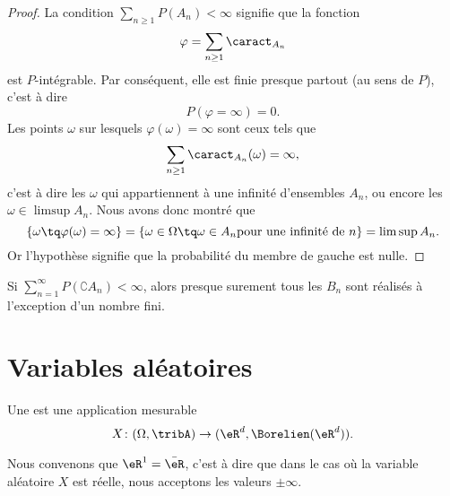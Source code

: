 \begin{proof}
    La condition \( \sum_{n\geq 1}P(A_n)<\infty\) signifie que la fonction
    \begin{equation}
        \varphi=\sum_{n\geq 1}\caract_{A_n}
    \end{equation}
    est \( P\)-intégrable. Par conséquent, elle est finie presque partout (au sens de \( P\)), c'est à dire
    \begin{equation}
        P(\varphi=\infty)=0.
    \end{equation}
    Les points \( \omega\) sur lesquels \( \varphi(\omega)=\infty\) sont ceux tels que
    \begin{equation}
        \sum_{n\geq 1}\caract_{A_n}(\omega)=\infty,
    \end{equation}
    c'est à dire les \( \omega\) qui appartiennent à une infinité d'ensembles \( A_n\), ou encore les \( \omega\in\limsup A_n\). Nous avons donc montré que
    \begin{equation}
        \{ \omega\tq \varphi(\omega)=\infty \}=\{ \omega\in\Omega\tq \omega\in A_n\text{pour une infinité de \( n\)} \}=\limsup A_n.
    \end{equation}
    Or l'hypothèse signifie que la probabilité du membre de gauche est nulle.
\end{proof}

\begin{corollary}
    Si \( \sum_{n=1}^{\infty}P(\complement A_n)<\infty\), alors presque surement tous les \( B_n\) sont réalisés à l'exception d'un nombre fini.
\end{corollary}

\section{Variables aléatoires}

\begin{definition}
    Une  est une application mesurable
    \begin{equation}
        X\colon (\Omega,\tribA)\to (\eR^d,\Borelien(\eR^d)).
    \end{equation}
\end{definition}
Nous convenons que \( \eR^1=\bar\eR\), c'est à dire que dans le cas où la variable aléatoire \( X\) est réelle, nous acceptons les valeurs \( \pm\infty\).


